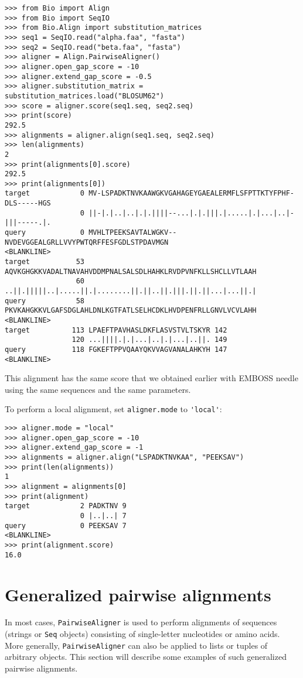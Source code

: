 \begin{verbatim}
>>> from Bio import Align
>>> from Bio import SeqIO
>>> from Bio.Align import substitution_matrices
>>> seq1 = SeqIO.read("alpha.faa", "fasta")
>>> seq2 = SeqIO.read("beta.faa", "fasta")
>>> aligner = Align.PairwiseAligner()
>>> aligner.open_gap_score = -10
>>> aligner.extend_gap_score = -0.5
>>> aligner.substitution_matrix = substitution_matrices.load("BLOSUM62")
>>> score = aligner.score(seq1.seq, seq2.seq)
>>> print(score)
292.5
>>> alignments = aligner.align(seq1.seq, seq2.seq)
>>> len(alignments)
2
>>> print(alignments[0].score)
292.5
>>> print(alignments[0])
target            0 MV-LSPADKTNVKAAWGKVGAHAGEYGAEALERMFLSFPTTKTYFPHF-DLS-----HGS
                  0 ||-|.|..|..|.|.||||--...|.|.|||.|.....|.|...|..|-|||-----.|.
query             0 MVHLTPEEKSAVTALWGKV--NVDEVGGEALGRLLVVYPWTQRFFESFGDLSTPDAVMGN
<BLANKLINE>
target           53 AQVKGHGKKVADALTNAVAHVDDMPNALSALSDLHAHKLRVDPVNFKLLSHCLLVTLAAH
                 60 ..||.|||||..|.....||.|........||.||..||.|||.||.||...|...||.|
query            58 PKVKAHGKKVLGAFSDGLAHLDNLKGTFATLSELHCDKLHVDPENFRLLGNVLVCVLAHH
<BLANKLINE>
target          113 LPAEFTPAVHASLDKFLASVSTVLTSKYR 142
                120 ...||||.|.|...|..|.|...|..||. 149
query           118 FGKEFTPPVQAAYQKVVAGVANALAHKYH 147
<BLANKLINE>
\end{verbatim}

This alignment has the same score that we obtained earlier with EMBOSS needle
using the same sequences and the same parameters.

To perform a local alignment, set \verb+aligner.mode+ to \verb+'local'+:

\begin{verbatim}
>>> aligner.mode = "local"
>>> aligner.open_gap_score = -10
>>> aligner.extend_gap_score = -1
>>> alignments = aligner.align("LSPADKTNVKAA", "PEEKSAV")
>>> print(len(alignments))
1
>>> alignment = alignments[0]
>>> print(alignment)
target            2 PADKTNV 9
                  0 |..|..| 7
query             0 PEEKSAV 7
<BLANKLINE>
>>> print(alignment.score)
16.0
\end{verbatim}

\section{Generalized pairwise alignments}
\label{sec:generalized-pairwise}

In most cases, \verb+PairwiseAligner+ is used to perform alignments of sequences (strings or \verb+Seq+ objects) consisting of single-letter nucleotides or amino acids. More generally, \verb+PairwiseAligner+ can also be applied to lists or tuples of arbitrary objects. This section will describe some examples of such generalized pairwise alignments.

